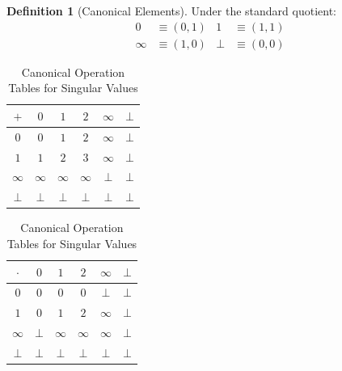 \documentclass[11pt,a4paper]{article}
\theoremstyle{plain}
\theoremstyle{definition}
\newtheorem{definition}[theorem]{Definition}
\theoremstyle{remark}
\newcommand{\bott}{\bot}
\newcommand{\inft}{\infty}
\begin{document}
\begin{definition}[Canonical Elements]
\label{def:elements}
Under the standard quotient:
\begin{align}
0 &\equiv (0, 1) & 1 &\equiv (1, 1) \\
\inft &\equiv (1, 0) & \bott &\equiv (0, 0)
\end{align}
\end{definition}

\begin{table}[htbp]
\centering
\small
\caption{Canonical Operation Tables for Singular Values}
\label{tab:op-tables}
\begin{tabular}{c|ccccc}
\toprule
$+$ & $0$ & $1$ & $2$ & $\inft$ & $\bott$ \\
\midrule
$0$ & $0$ & $1$ & $2$ & $\inft$ & $\bott$ \\
$1$ & $1$ & $2$ & $3$ & $\inft$ & $\bott$ \\
$\inft$ & $\inft$ & $\inft$ & $\inft$ & $\bott$ & $\bott$ \\
$\bott$ & $\bott$ & $\bott$ & $\bott$ & $\bott$ & $\bott$ \\
\bottomrule
\end{tabular}
\quad
\begin{tabular}{c|ccccc}
\toprule
$\cdot$ & $0$ & $1$ & $2$ & $\inft$ & $\bott$ \\
\midrule
$0$ & $0$ & $0$ & $0$ & $\bott$ & $\bott$ \\
$1$ & $0$ & $1$ & $2$ & $\inft$ & $\bott$ \\
$\inft$ & $\bott$ & $\inft$ & $\inft$ & $\inft$ & $\bott$ \\
$\bott$ & $\bott$ & $\bott$ & $\bott$ & $\bott$ & $\bott$ \\
\bottomrule
\end{tabular}
\end{table}
\end{document}
